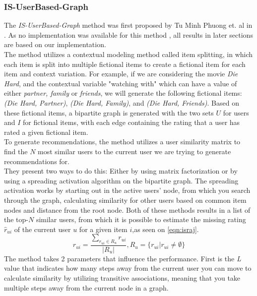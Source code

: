 \subsubsection{IS-UserBased-Graph}\label{method:IS-UserBased-Graph}
The \textit{IS-UserBased-Graph} method was first proposed by Tu Minh Phuong et. al in \cite{GraphBasedCollaborativePaper}.
As no implementation was available for this method , all results in later sections are based on our implementation.\\
The method utilizes a contextual modeling method called item splitting, in which each item is split into multiple fictional items to create a fictional item for each item and context variation.
For example, if we are considering the movie \textit{Die Hard}, and the contextual variable "watching with" which can have a value of either \textit{partner, family} or \textit{friends}, we will generate the following fictional items: \textit{(Die Hard, Partner)}, \textit{(Die Hard, Family)}, and \textit{(Die Hard, Friends)}.
Based on these fictional items, a bipartite graph is generated with the two sets $U$ for users and $I$ for fictional items, with each edge containing the rating that a user has rated a given fictional item.\\
To generate recommendations, the method utilizes a user similarity matrix to find the $N$ most similar users to the current user we are trying to generate recommendations for.\\
They present two ways to do this: Either by using matrix factorization or by using a spreading activation algorithm on the bipartite graph.
The spreading activation works by starting out in the active users' node, from which you search through the graph, calculating similarity for other users based on common item nodes and distance from the root node.
Both of these methods results in a list of the top-$N$ similar users, from which it is possible to estimate the missing rating $\hat{r}_{ui}$ of the current user $u$ for a given item $i$,as seen on \autoref{eqn:israj}.
\begin{equation}
    \label{eqn:israj}
    \hat{r}_{ui} = \frac{\sum_{r_{ui} \in R_u} r_{ui}}{|R_u|}, R_u = \{ r_{ui} | r_{ui} \neq \emptyset\}
\end{equation}
The method takes 2 parameters that influence the performance.
First is the \textit{L} value that indicates how many steps away from the current user you can move to calculate similarity by utilizing transitive associations, meaning that you take multiple steps away from the current node in a graph.
